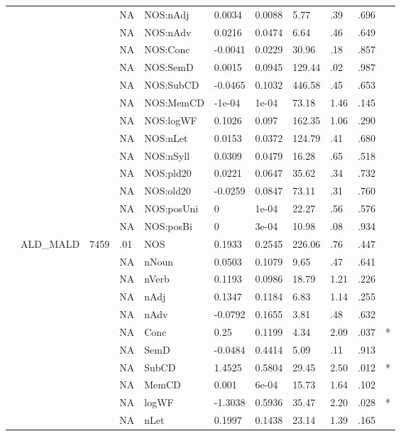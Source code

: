 \begin{table}[ht]
\begin{tabular}{lllllllllll}
   &  &  & NA & NOS:nAdj & 0.0034 & 0.0088 & 5.77 & .39 & .696 &   \\ 
   &  &  & NA & NOS:nAdv & 0.0216 & 0.0474 & 6.64 & .46 & .649 &   \\ 
   &  &  & NA & NOS:Conc & -0.0041 & 0.0229 & 30.96 & .18 & .857 &   \\ 
   &  &  & NA & NOS:SemD & 0.0015 & 0.0945 & 129.44 & .02 & .987 &   \\ 
   &  &  & NA & NOS:SubCD & -0.0465 & 0.1032 & 446.58 & .45 & .653 &   \\ 
   &  &  & NA & NOS:MemCD & -1e-04 & 1e-04 & 73.18 & 1.46 & .145 &   \\ 
   &  &  & NA & NOS:logWF & 0.1026 & 0.097 & 162.35 & 1.06 & .290 &   \\ 
   &  &  & NA & NOS:nLet & 0.0153 & 0.0372 & 124.79 & .41 & .680 &   \\ 
   &  &  & NA & NOS:nSyll & 0.0309 & 0.0479 & 16.28 & .65 & .518 &   \\ 
   &  &  & NA & NOS:pld20 & 0.0221 & 0.0647 & 35.62 & .34 & .732 &   \\ 
   &  &  & NA & NOS:old20 & -0.0259 & 0.0847 & 73.11 & .31 & .760 &   \\ 
   &  &  & NA & NOS:posUni & 0 & 1e-04 & 22.27 & .56 & .576 &   \\ 
   &  &  & NA & NOS:posBi & 0 & 3e-04 & 10.98 & .08 & .934 &   \\ 
   & ALD\_MALD & 7459 & .01 & NOS & 0.1933 & 0.2545 & 226.06 & .76 & .447 &   \\ 
   &  &  & NA & nNoun & 0.0503 & 0.1079 & 9.65 & .47 & .641 &   \\ 
   &  &  & NA & nVerb & 0.1193 & 0.0986 & 18.79 & 1.21 & .226 &   \\ 
   &  &  & NA & nAdj & 0.1347 & 0.1184 & 6.83 & 1.14 & .255 &   \\ 
   &  &  & NA & nAdv & -0.0792 & 0.1655 & 3.81 & .48 & .632 &   \\ 
   &  &  & NA & Conc & 0.25 & 0.1199 & 4.34 & 2.09 & .037 & * \\ 
   &  &  & NA & SemD & -0.0484 & 0.4414 & 5.09 & .11 & .913 &   \\ 
   &  &  & NA & SubCD & 1.4525 & 0.5804 & 29.45 & 2.50 & .012 & * \\ 
   &  &  & NA & MemCD & 0.001 & 6e-04 & 15.73 & 1.64 & .102 &   \\ 
   &  &  & NA & logWF & -1.3038 & 0.5936 & 35.47 & 2.20 & .028 & * \\ 
   &  &  & NA & nLet & 0.1997 & 0.1438 & 23.14 & 1.39 & .165 &   \\ 

\end{tabular}
\end{table}
